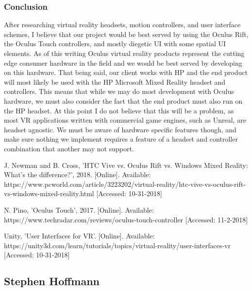 \documentclass[onecolumn, draftclsnofoot,10pt, compsoc]{IEEEtran}
\begin{document}
\subsubsection{Conclusion}
After researching virtual reality headsets, motion controllers, and user interface schemes, I believe that our project would be best served by using the Oculus Rift, the Oculus Touch controllers, and mostly diegetic UI with some spatial UI elements. As of this writing Oculus virtual reality products represent the cutting edge consumer hardware in the field and we would be best served by developing on this hardware. That being said, our client works with HP and the end product will most likely be used with the HP Microsoft Mixed Reality headset and controllers. This means that while we may do most development with Oculus hardware, we must also consider the fact that the end product must also run on the HP headset. At this point I do not believe that this will be a problem, as most VR applications written with commercial game engines, such as Unreal, are headset agnostic. We must be aware of hardware specific features though, and make sure nothing we implement requires a feature of a headset and controller combination that another may not support. 

\bigskip
\begin{thebibliography}{999}

  J. Newman and B. Cross,
  'HTC Vive vs. Oculus Rift vs. Windows Mixed Reality: What's the difference?',
  2018.
  [Online].
  Available: https://www.pcworld.com/article/3223202/virtual-reality/htc-vive-vs-oculus-rift-vs-windows-mixed-reality.html
  [Accessed: 10-31-2018]

  N. Pino,
  'Oculus Touch',
  2017.
  [Online].
  Available: https://www.techradar.com/reviews/oculus-touch-controller
  [Accessed: 11-2-2018]

  Unity,
  'User Interfaces for VR'.
  [Online].
  Available: https://unity3d.com/learn/tutorials/topics/virtual-reality/user-interfaces-vr
  [Accessed: 10-31-2018]
 
\end{thebibliography}

\subsection{Stephen Hoffmann}
\end{document}
